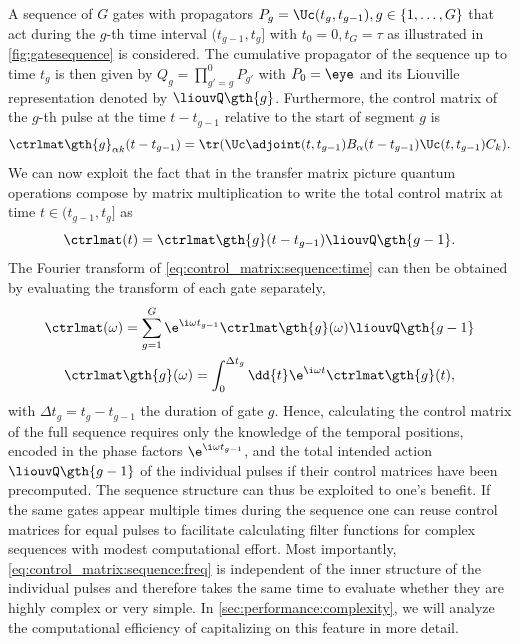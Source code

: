 A sequence of $G$ gates with propagators $P_g = \Uc(t_g, t_{g-1}), g\in\lbrace 1,\dotsc,G\rbrace$ that act during the $g$-th time interval $(t_{g-1}, t_g]$ with $t_0 =  0, t_G = \tau$ as illustrated in \cref{fig:gatesequence} is considered. The cumulative propagator of the sequence up to time $t_g$ is then given by $Q_g = \prod_{g'=g}^0 P_{g'}$ with $P_0 = \eye$ and its Liouville representation denoted by $\liouvQ\gth{g}$. Furthermore, the control matrix of the $g$-th pulse at the time $t - t_{g-1}$ relative to the start of segment $g$ is
\begin{equation}\label{eq:control_matrix:pulse:time}
    \ctrlmat\gth{g}_{\alpha k}(t - t_{g-1}) = \tr(\Uc\adjoint(t, t_{g-1})B_\alpha(t - t_{g-1}) \Uc(t, t_{g-1}) C_k).
\end{equation}
We can now exploit the fact that in the transfer matrix picture quantum operations compose by matrix multiplication to write the total control matrix at time $t\in (t_{g-1}, t_g]$ as
\begin{equation}\label{eq:control_matrix:sequence:time}
    \ctrlmat(t) = \ctrlmat\gth{g}(t - t_{g-1})\liouvQ\gth{g-1}.
\end{equation}
The Fourier transform of \cref{eq:control_matrix:sequence:time} can then be obtained by evaluating the transform of each gate separately,
\begin{gather}
    \ctrlmat(\omega) = \sum_{g = 1}^G \e^{\i\omega t_{g-1}}\ctrlmat\gth{g}(\omega)\liouvQ\gth{g-1} \label{eq:control_matrix:sequence:freq}\\
    \ctrlmat\gth{g}(\omega) = \int_0^{\Delta t_g}\dd{t}\e^{\i\omega t}\ctrlmat\gth{g}(t), \label{eq:control_matrix:pulse:freq}
\end{gather}
with $\Delta t_g = t_g - t_{g-1}$ the duration of gate $g$. Hence, calculating the control matrix of the full sequence requires only the knowledge of the temporal positions, encoded in the phase factors $\e^{\i\omega t_{g-1}}$, and the total intended action $\liouvQ\gth{g-1}$ of the individual pulses if their control matrices have been precomputed. The sequence structure can thus be exploited to one's benefit. If the same gates appear multiple times during the sequence one can reuse control matrices for equal pulses to facilitate calculating filter functions for complex sequences with modest computational effort. Most importantly, \cref{eq:control_matrix:sequence:freq} is independent of the inner structure of the individual pulses and therefore takes the same time to evaluate whether they are highly complex or very simple. In \cref{sec:performance:complexity}, we will analyze the computational efficiency of capitalizing on this feature in more detail.

